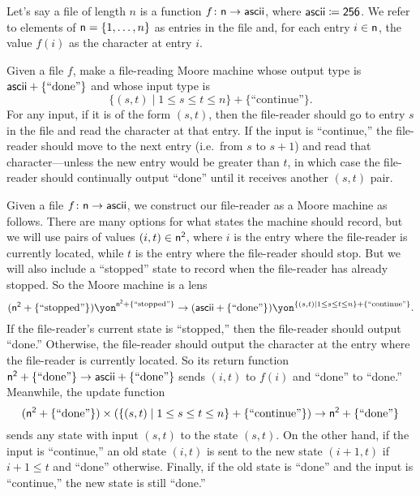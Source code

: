 \documentclass[Book-Poly]{subfiles}
\begin{document}
\begin{exercise}\label{exc.file_reader}
Let's say a file of length $n$ is a function $f\colon\mathsf{n}\to\mathsf{ascii}$, where $\mathsf{ascii}\coloneqq\textsf{2}\textsf{5}\textsf{6}$.
We refer to elements of $\mathsf{n}=\{1,\ldots,n\}$ as entries in the file and, for each entry $i \in \mathsf{n}$, the value $f(i)$ as the character at entry $i$.

Given a file $f$, make a file-reading Moore machine whose output type is $\mathsf{ascii} + \{\text{``done''}\}$
and whose input type is
\[
\{(s,t)\mid 1\leq s\leq t\leq n\}+\{\text{``continue''}\}.
\]
For any input, if it is of the form $(s,t)$, then the file-reader should go to entry $s$ in the file and read the character at that entry.
If the input is ``continue,'' the file-reader should move to the next entry (i.e.\ from $s$ to $s+1$) and read that character—unless the new entry would be greater than $t$, in which case the file-reader should continually output ``done'' until it receives another $(s,t)$ pair.
\begin{solution}
Given a file $f \colon \mathsf{n} \to \mathsf{ascii}$, we construct our file-reader as a Moore machine as follows.
There are many options for what states the machine should record, but we will use pairs of values $(i, t) \in \mathsf{n}^{\textsf{2}}$, where $i$ is the entry where the file-reader is currently located, while $t$ is the entry where the file-reader should stop.
But we will also include a ``stopped'' state to record when the file-reader has already stopped.
So the Moore machine is a lens
\[
    (\ord{n}^\2+\{\text{``stopped''}\})\yon^{\ord{n}^\2+\{\text{``stopped''}\}} \to (\Set{ascii} + \{\text{``done''}\})\yon^{\{(s,t)\mid 1\leq s\leq t\leq n\}+\{\text{``continue''}\}}.
\]
If the file-reader's current state is ``stopped,'' then the file-reader should output ``done.'' Otherwise, the file-reader should output the character at the entry where the file-reader is currently located.
So its return function $\mathsf{n}^{\textsf{2}}+\{\text{``done''}\} \to \mathsf{ascii} + \{\text{``done''}\}$ sends $(i, t)$ to $f(i)$ and ``done'' to ``done.''
Meanwhile, the update function
\[
    (\mathsf{n}^{\textsf{2}}+\{\text{``done''}\}) \times (\{(s,t)\mid 1\leq s\leq t\leq n\}+\{\text{``continue''}\}) \to \mathsf{n}^{\textsf{2}}+\{\text{``done''}\}
\]
sends any state with input $(s,t)$ to the state $(s,t)$.
On the other hand, if the input is ``continue,'' an old state $(i,t)$ is sent to the new state $(i+1,t)$ if $i + 1 \leq t$ and ``done'' otherwise.
Finally, if the old state is ``done'' and the input is ``continue,'' the new state is still ``done.''
\end{solution}
\end{exercise}
\end{document}
